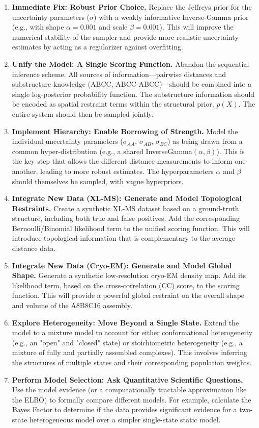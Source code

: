 \documentclass{article}
\begin{document}
\begin{enumerate}
  \item \textbf{Immediate Fix: Robust Prior Choice.} Replace the Jeffreys prior for the uncertainty parameters ($\sigma$) with a weakly informative Inverse-Gamma prior (e.g., with shape $\alpha=0.001$ and scale $\beta=0.001$). This will improve the numerical stability of the sampler and provide more realistic uncertainty estimates by acting as a regularizer against overfitting.
  \item \textbf{Unify the Model: A Single Scoring Function.} Abandon the sequential inference scheme. All sources of information—pairwise distances and substructure knowledge (ABCC, ABCC-ABCC)—should be combined into a single log-posterior probability function. The substructure information should be encoded as spatial restraint terms within the structural prior, $p(X)$. The entire system should then be sampled jointly.
  \item \textbf{Implement Hierarchy: Enable Borrowing of Strength.} Model the individual uncertainty parameters ($\sigma_{AA}$, $\sigma_{AB}$, $\sigma_{BC}$) as being drawn from a common hyper-distribution (e.g., a shared InverseGamma$(\alpha, \beta)$). This is the key step that allows the different distance measurements to inform one another, leading to more robust estimates. The hyperparameters $\alpha$ and $\beta$ should themselves be sampled, with vague hyperpriors.
  \item \textbf{Integrate New Data (XL-MS): Generate and Model Topological Restraints.} Create a synthetic XL-MS dataset based on a ground-truth structure, including both true and false positives. Add the corresponding Bernoulli/Binomial likelihood term to the unified scoring function. This will introduce topological information that is complementary to the average distance data.
  \item \textbf{Integrate New Data (Cryo-EM): Generate and Model Global Shape.} Generate a synthetic low-resolution cryo-EM density map. Add its likelihood term, based on the cross-correlation (CC) score, to the scoring function. This will provide a powerful global restraint on the overall shape and volume of the A8B8C16 assembly.
  \item \textbf{Explore Heterogeneity: Move Beyond a Single State.} Extend the model to a mixture model to account for either conformational heterogeneity (e.g., an "open" and "closed" state) or stoichiometric heterogeneity (e.g., a mixture of fully and partially assembled complexes). This involves inferring the structures of multiple states and their corresponding population weights.
  \item \textbf{Perform Model Selection: Ask Quantitative Scientific Questions.} Use the model evidence (or a computationally tractable approximation like the ELBO) to formally compare different models. For example, calculate the Bayes Factor to determine if the data provides significant evidence for a two-state heterogeneous model over a simpler single-state static model.
\end{enumerate}
\end{document}
